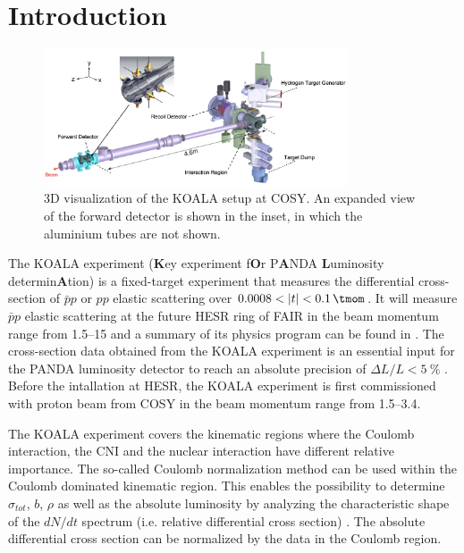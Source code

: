 \documentclass[number,5p]{elsarticle}
\begin{document}

\section{Introduction}
\label{sec:introduction}

\begin{figure}[htbp]
	\centering
	\includegraphics[width=0.8\textwidth]{./koala_setup_new.png}
	\caption{3D visualization of the KOALA setup at COSY. An expanded view of the
  forward detector is shown in the inset, in which the aluminium tubes are not shown.}
	\label{fig:setup}
\end{figure}

The KOALA experiment (\textbf{K}ey experiment f\textbf{O}r P\textbf{A}NDA \textbf{L}uminosity determin\textbf{A}tion) is a fixed-target experiment that measures the differential cross-section of $\bar{p}p$ or $pp$ elastic scattering over $0.0008 < |t| < \SI{0.1}{\tmom}$.
It will measure $\bar{p}p$ elastic scattering at the future HESR ring of FAIR \cite{FAIR} in the beam momentum range from
\SIrange{1.5}{15}{\momentum} and a summary of its physics program can be found
in \cite{panda}.
The cross-section data obtained from the KOALA experiment is an essential input for the PANDA luminosity detector to
reach an absolute precision of ${\Delta L}/{L} < \SI{5}{\percent}$ \cite{lmd_tdr}.
Before the intallation at HESR, the KOALA experiment is first commissioned with
proton beam from COSY \cite{COSY} in the beam momentum range from
\SIrange{1.5}{3.4}{\momentum}.

The KOALA experiment covers the kinematic regions where the
Coulomb interaction, the CNI and the nuclear interaction have different relative importance.
The so-called Coulomb normalization method \cite{bernard1987real,jenni2008atlas}
can be used within the Coulomb dominated kinematic region.
This enables the possibility to determine \({\sigma}_{tot}\), \(b\), \(\rho\) as well as
the absolute luminosity by analyzing the characteristic shape of the $dN/dt$
spectrum (i.e. relative differential cross section) \cite{koala_article}.
The absolute differential cross section can be normalized by the data in the
Coulomb region.
\end{document}
